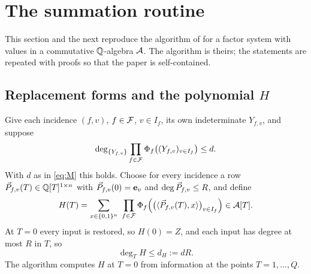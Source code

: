 \section{The summation routine}\label{sec:routine}

This section and the next reproduce the algorithm of \oai{}
\cite[Sections 3--4]{OAI26} for a factor system with values in a commutative
$\mathbb{Q}$-algebra $\mathcal{A}$. The algorithm is theirs; the statements are repeated with
proofs so that the paper is self-contained.

\subsection{Replacement forms and the polynomial $H$}
Give each incidence $(f,v)$, $f\in\mathcal{F}$, $v\in I_f$, its own indeterminate
$Y_{f,v}$, and suppose
\begin{equation}\label{eq:degbound}
  \deg_{\{Y_{f,v}\}}\prod_{f\in\mathcal{F}}\Phi_f\bigl((Y_{f,v})_{v\in I_f}\bigr)\le d .
\end{equation}
With $d$ as in \eqref{eq:M} this holds. Choose for every incidence a row
$\vec{P}_{f,v}(T)\in\mathbb{Q}[T]^{1\times n}$ with $\vec{P}_{f,v}(0)=\mathbf{e}_v$ and $\deg\vec{P}_{f,v}\le R$,
and define
\begin{equation}\label{eq:H}
  H(T)=\sum_{x\in\{0,1\}^n}\ \prod_{f\in\F}\Phi_f\Bigl(\bigl(\ip{\PP_{f,v}(T)}{x}\bigr)_{v\in I_f}\Bigr)\in\A[T].
\end{equation}
At $T=0$ every input is restored, so $H(0)=Z$, and each input has degree at most
$R$ in $T$, so
\begin{equation}\label{eq:dH}
  \deg_T H\le d_H:=dR .
\end{equation}
The algorithm computes $H$ at $T=0$ from information at the points $T=1,\dots,Q$.

